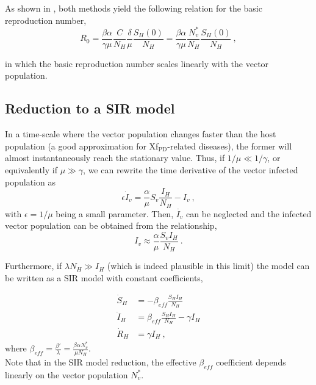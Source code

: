 As shown in \cite{vectoresAG}, both methods yield the following relation
for the basic reproduction number,
\begin{equation}
    R_0 = \frac{\beta \alpha}{\gamma
        \mu}\frac{C}{N_H}\frac{\delta}{\mu}\frac{S_H(0)}{N_H}=\frac{\beta
        \alpha}{\gamma \mu}\frac{N_v^*}{N_H}\frac{S_H(0)}{N_H}\ ,
\end{equation}

in which the basic reproduction number scales linearly with the vector
population.

\subsection{Reduction to a SIR model}

In a time-scale where the vector population changes faster than the host
population (a good approximation for Xf$_{\textrm{PD}}$-related diseases), the
former will almost instantaneously reach the stationary value. Thus, if
$1/\mu\ll1/\gamma$, or equivalently if $\mu\gg\gamma$, we can rewrite the time
derivative of the vector infected population as
\begin{equation}
    \epsilon\dot{I}_v=\frac{\alpha}{\mu}S_v\frac{I_H}{N_H} - I_v \ ,
\end{equation}
with $\epsilon=1/\mu$ being a small parameter. Then, $\dot{I_v}$ can be
neglected and the infected vector population can be obtained from the
relationship,
\begin{equation}\label{eq:Iv_timescale_approx}
    I_v\approx\frac{\alpha}{\mu}\frac{S_v I_H}{N_H} \ .
\end{equation}

Furthermore, if $\lambda N_H \gg I_H$ (which is indeed plausible in this
limit) the model can be written as a SIR model with constant coefficients,

\begin{equation}\label{eq:SIR}
    \begin{aligned}
        \dot{S}_H & =-\beta_{eff}\frac{S_HI_H}{N_H}            \\
        \dot{I}_H & =\beta_{eff}\frac{S_HI_H}{N_H}- \gamma I_H \\
        \dot{R}_H & =\gamma I_H \ ,
    \end{aligned}
\end{equation}
where $\displaystyle\beta_{eff}=\frac{\beta'}{\lambda}=\frac{\beta\alpha
        N_v^*}{\mu N_H}$.\\

Note that in the SIR model reduction, the effective $\beta_{eff}$
coefficient depends linearly on the vector population $N_v^*$.

